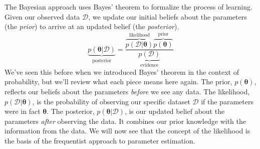 The Bayesian approach uses Bayes' theorem to formalize the process of learning. Given our observed data $\mathcal{D}$, we update our initial beliefs about the parameters (the \textit{prior}) to arrive at an updated belief (the \textit{posterior}).
\begin{equation}
    \underbrace{p(\boldsymbol{\theta}|\mathcal{D})}_{\text{posterior}} = \frac{\overbrace{p(\mathcal{D}|\boldsymbol{\theta})}^{\text{likelihood}} \overbrace{p(\boldsymbol{\theta})}^{\text{prior}}}{\underbrace{p(\mathcal{D})}_{\text{evidence}}}
    \label{eq:bayes-theorem-annotated}
\end{equation}
We've seen this before when we introduced Bayes' theorem in the context of probability, but we'll review what each piece means here again. The prior, $p(\boldsymbol{\theta})$, reflects our beliefs about the parameters \textit{before} we see any data. The likelihood, $p(\mathcal{D}|\boldsymbol{\theta})$, is the probability of observing our specific dataset $\mathcal{D}$ if the parameters were in fact $\boldsymbol{\theta}$. The posterior, $p(\boldsymbol{\theta}|\mathcal{D})$, is our updated belief about the parameters \textit{after} observing the data. It combines our prior knowledge with the information from the data. We will now see that the concept of the likelihood is the basis of the frequentist approach to parameter estimation.

